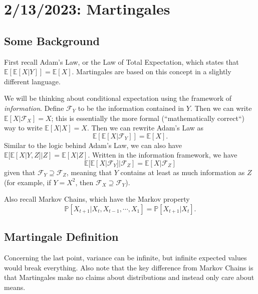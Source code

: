 \chapter{2/13/2023: Martingales}
\section{Some Background}
First recall Adam's Law, or the Law of Total Expectation, which states that $\mathbb E[\mathbb E[X|Y]] = \mathbb E[X]$. Martingales are based on this concept in a slightly different language.

We will be thinking about conditional expectation using the framework of \textit{information}. Define $\mathcal F_Y$ to be the information contained in $Y$. Then we can write $\mathbb E[X|\mathcal F_X] = X$; this is essentially the more formal (``mathematically correct``) way to write $\mathbb E[X|X] = X$. Then we can rewrite Adam's Law as $$ \mathbb E[\mathbb E[X|\mathcal F_Y]] = \mathbb E[X]. $$ Similar to the logic behind Adam's Law, we can also have $\mathbb E[\mathbb E[X|Y,Z]|Z] = \mathbb E[X|Z]$. Written in the information framework, we have $$\mathbb E[\mathbb E[X|\mathcal F_Y]|\mathcal F_Z]=\mathbb E[X|\mathcal F_Z]$$ given that $\mathcal F_Y\supseteq\mathcal F_Z$, meaning that $Y$ contains at least as much information as $Z$ (for example, if $Y=X^2$, then $\mathcal F_X\supseteq\mathcal F_Y$).

Also recall Markov Chains, which have the Markov property $$ \mathbb P[X_{t+1}|X_t,X_{t-1},\cdots,X_1] = \mathbb P[X_{t+1}|X_t]. $$ 

\section{Martingale Definition}
Concerning the last point, variance can be infinite, but infinite expected values would break everything. Also note that the key difference from Markov Chains is that Martingales make no claims about distributions and instead only care about means.

